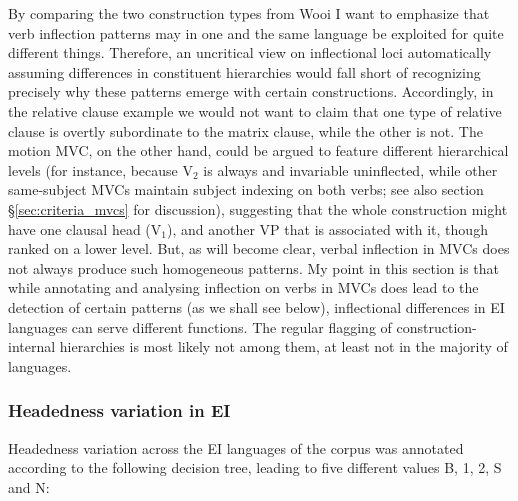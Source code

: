By comparing the two construction types from Wooi I want to emphasize that verb inflection patterns may in one and the same language be exploited for quite different things. Therefore, an uncritical view on inflectional loci automatically assuming differences in constituent hierarchies would fall short of recognizing precisely why these patterns emerge with certain constructions. Accordingly, in the relative clause example we would not want to claim that one type of relative clause is overtly subordinate to the matrix clause, while the other is not. The motion MVC, on the other hand, could be argued to feature different hierarchical levels (for instance, because V$_2$ is always and invariable uninflected, while other same-subject MVCs maintain subject indexing on both verbs; see also section §\ref{sec:criteria_mvcs} for discussion), suggesting that the whole construction might have one clausal head (V$_1$), and another VP that is associated with it, though ranked on a lower level. But, as will become clear, verbal inflection in MVCs does not always produce such homogeneous patterns. My point in this section is that while annotating and analysing inflection on verbs in MVCs does lead to the detection of certain patterns (as we shall see below), inflectional differences in EI languages can serve different functions. The regular flagging of construction-internal hierarchies is most likely not among them, at least not in the majority of languages.

\subsubsection{Headedness variation in EI}\label{sec:headednessEI}

Headedness variation across the EI languages of the corpus was annotated according to the following decision tree, leading to five different values B, 1, 2, S and N:


